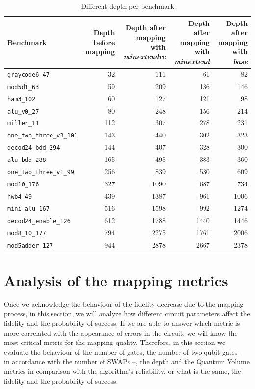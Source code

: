 \begin{table}[htbp]
\caption{\label{tab:depth_per_bench}
Different depth per benchmark}
\centering
\tiny
\begin{tabular}{lrrrr}
\hline
Benchmark & Depth before mapping & Depth after mapping with \emph{minextendrc} & Depth after mapping with \emph{minextend} & Depth after mapping with \emph{base}\\
\hline
\texttt{graycode6\_47} & 32 & 111 & 61 & 82\\
\texttt{mod5d1\_63} & 59 & 209 & 136 & 146\\
\texttt{ham3\_102} & 60 & 127 & 121 & 98\\
\texttt{alu\_v0\_27} & 80 & 248 & 156 & 214\\
\texttt{miller\_11} & 112 & 307 & 278 & 231\\
\texttt{one\_two\_three\_v3\_101} & 143 & 440 & 302 & 323\\
\texttt{decod24\_bdd\_294} & 144 & 407 & 328 & 300\\
\texttt{alu\_bdd\_288} & 165 & 495 & 383 & 360\\
\texttt{one\_two\_three\_v1\_99} & 256 & 839 & 530 & 609\\
\texttt{mod10\_176} & 327 & 1090 & 687 & 734\\
\texttt{hwb4\_49} & 439 & 1387 & 961 & 1006\\
\texttt{mini\_alu\_167} & 516 & 1598 & 992 & 1274\\
\texttt{decod24\_enable\_126} & 612 & 1788 & 1440 & 1446\\
\texttt{mod8\_10\_177} & 794 & 2275 & 1761 & 2006\\
\texttt{mod5adder\_127} & 944 & 2878 & 2667 & 2378\\
\hline
\end{tabular}
\end{table}

\section{Analysis of the mapping metrics}
\label{sec:orgb1f6186}
Once we acknowledge the behaviour of the fidelity decrease due to the mapping process, in this section, we will analyze how different circuit parameters affect the fidelity and the probability of success.
If we are able to answer which metric is more correlated with the appearance of errors in the circuit, we will know the most critical metric for the mapping quality.
Therefore, in this section we evaluate the behaviour of the number of gates, the number of two-qubit gates -- in accordance with the number of SWAPs --, the depth and the Quantum Volume metrics in comparison with the algorithm's reliability, or what is the same, the fidelity and the probability of success.


